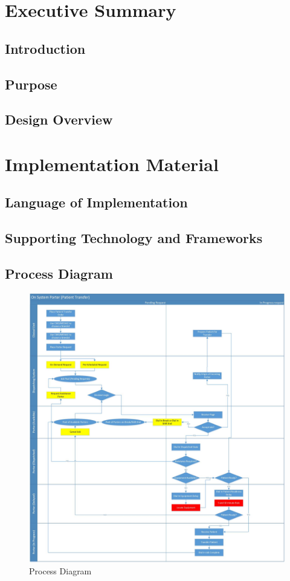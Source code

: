 \documentclass[paper=letter, fontsize=10pt]{scrartcl}
\numberwithin{equation}{section}		%
\numberwithin{figure}{section}			%
\numberwithin{table}{section}				%
\begin{document}
\section{Executive Summary}
\subsection{Introduction}
\subsection{Purpose}
\subsection{Design Overview}
\section{Implementation Material}
\subsection{Language of Implementation}
\subsection{Supporting Technology and Frameworks}
\newpage
\subsection{Process Diagram}
\begin{figure}[H]
	\begin{center}
		\includegraphics[width=1\columnwidth]{../Process Diagrams/Process Diagram.jpg}
		\caption{Process Diagram}
	\end{center}
\end{figure}
\newpage
\end{document}
